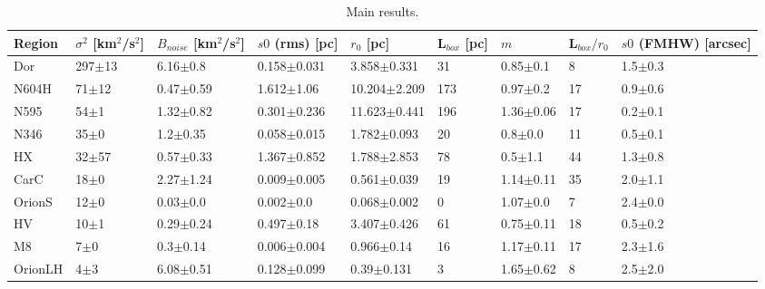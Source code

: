 \begin{table}
\centering
\caption{Main results.}
\begin{tabular}{lllllllll}
\toprule
  Region & $\sigma^2$ [km$^2$/s$^2$] & $B_{noise}$ [km$^2$/s$^2$] &  $s0$ (rms) [pc] &        $r_0$ [pc] & L$_{box}$ [pc] &            $m$ & L$_{box} / r_0$ & $s0$ (FMHW) [arcsec] \\
\midrule
     Dor &                297$\pm$13 &               6.16$\pm$0.8 &  0.158$\pm$0.031 &   3.858$\pm$0.331 &             31 &   0.85$\pm$0.1 &               8 &          1.5$\pm$0.3 \\
   N604H &                 71$\pm$12 &              0.47$\pm$0.59 &   1.612$\pm$1.06 &  10.204$\pm$2.209 &            173 &   0.97$\pm$0.2 &              17 &          0.9$\pm$0.6 \\
    N595 &                  54$\pm$1 &              1.32$\pm$0.82 &  0.301$\pm$0.236 &  11.623$\pm$0.441 &            196 &  1.36$\pm$0.06 &              17 &          0.2$\pm$0.1 \\
    N346 &                  35$\pm$0 &               1.2$\pm$0.35 &  0.058$\pm$0.015 &   1.782$\pm$0.093 &             20 &    0.8$\pm$0.0 &              11 &          0.5$\pm$0.1 \\
      HX &                 32$\pm$57 &              0.57$\pm$0.33 &  1.367$\pm$0.852 &   1.788$\pm$2.853 &             78 &    0.5$\pm$1.1 &              44 &          1.3$\pm$0.8 \\
    CarC &                  18$\pm$0 &              2.27$\pm$1.24 &  0.009$\pm$0.005 &   0.561$\pm$0.039 &             19 &  1.14$\pm$0.11 &              35 &          2.0$\pm$1.1 \\
  OrionS &                  12$\pm$0 &               0.03$\pm$0.0 &    0.002$\pm$0.0 &   0.068$\pm$0.002 &              0 &   1.07$\pm$0.0 &               7 &          2.4$\pm$0.0 \\
      HV &                  10$\pm$1 &              0.29$\pm$0.24 &   0.497$\pm$0.18 &   3.407$\pm$0.426 &             61 &  0.75$\pm$0.11 &              18 &          0.5$\pm$0.2 \\
      M8 &                   7$\pm$0 &               0.3$\pm$0.14 &  0.006$\pm$0.004 &    0.966$\pm$0.14 &             16 &  1.17$\pm$0.11 &              17 &          2.3$\pm$1.6 \\
 OrionLH &                   4$\pm$3 &              6.08$\pm$0.51 &  0.128$\pm$0.099 &    0.39$\pm$0.131 &              3 &  1.65$\pm$0.62 &               8 &          2.5$\pm$2.0 \\
\bottomrule
\end{tabular}
\end{table}
